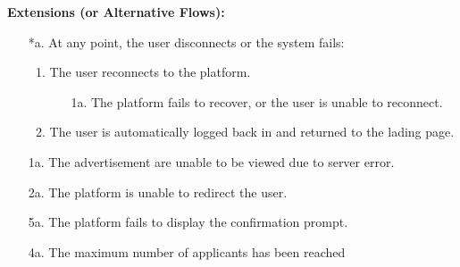 \begin{itemize}[label={[\textbf{UC}]}, align=left, leftmargin=*]
    \textbf{Extensions (or Alternative Flows):} 
    \begin{enumerate}[label=\arabic*.]
        \item[*a.] At any point, the user disconnects or the system fails:
            \begin{enumerate}[label=\arabic*.]
                \item The user reconnects to the platform.
                    \begin{enumerate}[label=\alph*.]
                        \item[1a.] The platform fails to recover, or the user is unable to reconnect.
                    \end{enumerate}
                 \item The user is automatically logged back in and returned to the lading page.
            \end{enumerate}
        \item[1a.] The advertisement are unable to be viewed due to server error. 
        \item[2a.] The platform is unable to redirect the user.
        \item[5a.] The platform fails to display the confirmation prompt.
        \item[4a.] The maximum number of applicants has been reached
        \end{enumerate}
     

\end{itemize}
